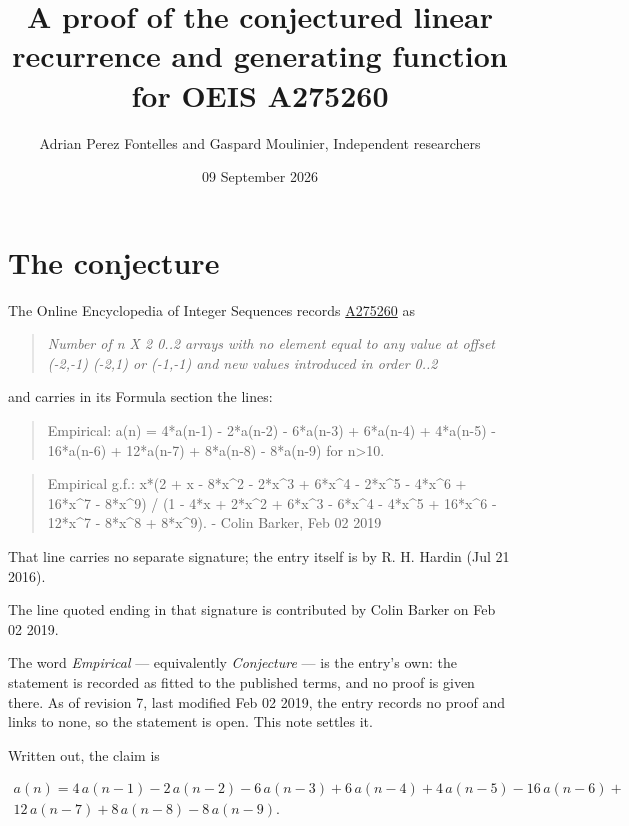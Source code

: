 \documentclass[11pt]{article}
\title{A proof of the conjectured linear recurrence and generating function for OEIS A275260}
\author{Adrian Perez Fontelles and Gaspard Moulinier, Independent researchers}
\date{09 September 2026}
\theoremstyle{definition}
\begin{document}
\maketitle
\section{The conjecture}

The Online Encyclopedia of Integer Sequences records \href{https://oeis.org/A275260}{A275260} as

\begin{quote}\itshape Number of n X 2 0..2 arrays with no element equal to any value at offset (-2,-1) (-2,1) or (-1,-1) and new values introduced in order 0..2\end{quote}

and carries in its Formula section the lines:

\begin{quote}\ttfamily Empirical: a(n) = 4*a(n-1) - 2*a(n-2) - 6*a(n-3) + 6*a(n-4) + 4*a(n-5) - 16*a(n-6) + 12*a(n-7) + 8*a(n-8) - 8*a(n-9) for n>10.\end{quote}

\begin{quote}\ttfamily Empirical g.f.: x*(2 + x - 8*x\textasciicircum{}2 - 2*x\textasciicircum{}3 + 6*x\textasciicircum{}4 - 2*x\textasciicircum{}5 - 4*x\textasciicircum{}6 + 16*x\textasciicircum{}7 - 8*x\textasciicircum{}9) / (1 - 4*x + 2*x\textasciicircum{}2 + 6*x\textasciicircum{}3 - 6*x\textasciicircum{}4 - 4*x\textasciicircum{}5 + 16*x\textasciicircum{}6 - 12*x\textasciicircum{}7 - 8*x\textasciicircum{}8 + 8*x\textasciicircum{}9). - Colin Barker, Feb 02 2019\end{quote}

That line carries no separate signature; the entry itself is by R. H. Hardin (Jul 21 2016).

The line quoted ending in that signature is contributed by Colin Barker on Feb 02 2019.

The word {\itshape Empirical} --- equivalently {\itshape Conjecture} --- is the entry's own: the statement is recorded as fitted to the published terms, and no proof is given there. As of revision 7, last modified Feb 02 2019, the entry records no proof and links to none, so the statement is open. This note settles it.

Written out, the claim is

\begin{multline*} a(n) = 4\,a(n-1) - 2\,a(n-2) - 6\,a(n-3) + 6\,a(n-4) + 4\,a(n-5) - 16\,a(n-6) + \\ 12\,a(n-7) + 8\,a(n-8) - 8\,a(n-9). \end{multline*}
\end{document}
